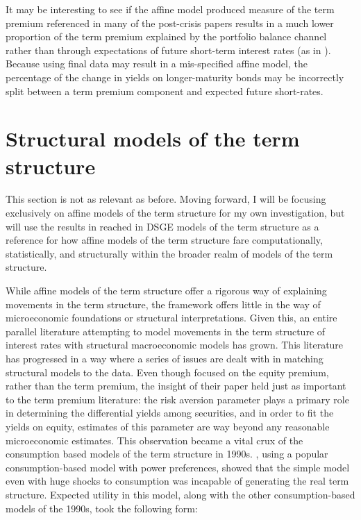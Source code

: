 \documentclass{article}
\numberwithin{equation}{section}
\begin{document}
It may be interesting to see if the affine model produced measure of the term
premium referenced in many of the post-crisis papers results in a much lower
proportion of the term premium explained by the portfolio balance channel
rather than through expectations of future short-term interest rates (as in
\citet{bauerrudebusch2011}). Because using final data may result in
a mis-specified affine model, the percentage of the change in yields on
longer-maturity bonds may be incorrectly split between a term premium component
and expected future short-rates.

\section{Structural models of the term structure}\label{sec:struct}

This section is not as relevant as before. Moving forward, I will be focusing
exclusively on affine models of the term structure for my own investigation,
but will use the results in reached in DSGE models of the term structure as
a reference for how affine models of the term structure fare computationally,
statistically,  and structurally within the broader realm of models of the term
structure.

While affine models of the term structure offer a rigorous way of explaining
movements in the term structure, the framework offers little in the way of
microeconomic foundations or structural interpretations. Given this, an entire
parallel literature attempting to model movements in the term structure of
interest rates with structural macroeconomic models has grown. This literature
has progressed in a way where a series of issues are dealt with in matching
structural models to the data. Even though \citet{mehraprescott1985} focused on
the equity premium, rather than the term premium, the insight of their paper
held just as important to the term premium literature: the risk aversion
parameter plays a primary role in determining the differential yields among
securities, and in order to fit the yields on equity, estimates of this
parameter are way beyond any reasonable microeconomic estimates. This
observation became a vital crux of the consumption based models of the term
structure in 1990s. \citet{donaldsonetal1990}, using a popular
consumption-based model with power preferences, showed that the simple model
even with huge shocks to consumption was incapable of generating the real term
structure. Expected utility in this model, along with the other
consumption-based models of the 1990s, took the following form:
\end{document}
